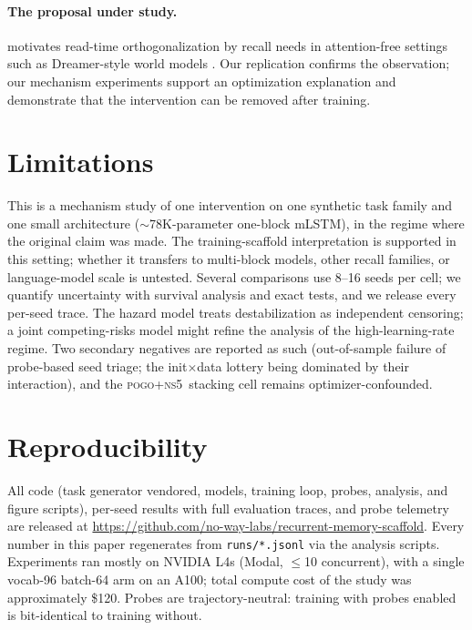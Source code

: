 \documentclass[11pt]{article}
\newcommand{\ns}{\textsc{ns5}}
\begin{document}
\paragraph{The proposal under study.} \citet{tambde2026ortho} motivates read-time
orthogonalization by recall needs in attention-free settings such as Dreamer-style
world models \citep{hafner2020dreamer}. Our replication confirms the observation;
our mechanism experiments support an optimization explanation and demonstrate
that the intervention can be removed after training.

\section{Limitations}
\label{sec:limitations}

This is a mechanism study of one intervention on one synthetic task family and one
small architecture ($\sim$78K-parameter one-block mLSTM), in the regime where the
original claim was made. The training-scaffold interpretation is supported in this
setting; whether it
transfers to multi-block models, other recall families, or language-model
scale is untested. Several comparisons use 8--16 seeds per cell; we quantify uncertainty with
survival analysis and exact tests, and we release every per-seed trace. The
hazard model treats destabilization as independent censoring; a joint
competing-risks model might refine the analysis of the high-learning-rate regime. Two
secondary negatives are
reported as such (out-of-sample failure of probe-based seed triage; the
init$\times$data lottery being dominated by their interaction), and the
\textsc{pogo}+\ns\ stacking cell remains optimizer-confounded.

\section*{Reproducibility}

All code (task generator vendored, models, training loop, probes, analysis, and
figure scripts), per-seed results with full evaluation traces, and probe telemetry
are released at \url{https://github.com/no-way-labs/recurrent-memory-scaffold}.
Every number in this paper regenerates from \texttt{runs/*.jsonl} via the analysis
scripts. Experiments ran mostly on NVIDIA L4s (Modal, $\le$10 concurrent), with a
single vocab-96 batch-64 arm on an A100; total compute cost of the study was
approximately \$120. Probes are
trajectory-neutral: training with probes enabled is bit-identical to training
without.



\end{document}
